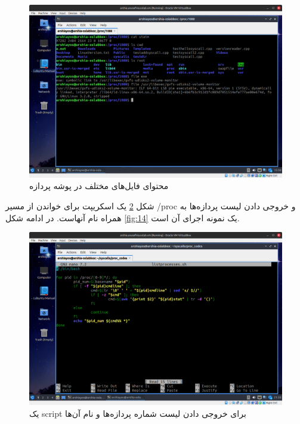 \documentclass[12pt]{article}
\begin{document}
	\begin{figure}[H]
		\centering
		\includegraphics[width=\textwidth]{report3-resources/13.png}
		\caption{محتوای فایل‌های مختلف در پوشه پردازه}
		\label{fig:12}
	\end{figure}
	شکل \ref{fig:13} یک اسکریپت برای خواندن از مسیر /proc و خروجی دادن لیست پردازه‌ها به همراه نام آنهاست. در ادامه شکل \ref{fig:14} یک نمونه اجرای آن است.
	\begin{figure}[H]
		\centering
		\includegraphics[width=\textwidth]{report3-resources/14.png}
		\caption{یک script برای خروجی دادن لیست شماره پردازه‌ها و نام آن‌ها}
		\label{fig:13}
	\end{figure}
\end{document}
